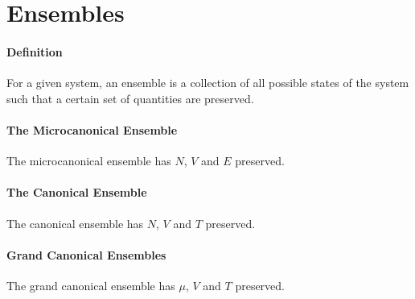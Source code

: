 \section{Ensembles}

\paragraph{Definition}
For a given system, an ensemble is a collection of all possible states of the system such that a certain set of quantities are preserved.

\paragraph{The Microcanonical Ensemble}
The microcanonical ensemble has $N$, $V$ and $E$ preserved.

\paragraph{The Canonical Ensemble}
The canonical ensemble has $N$, $V$ and $T$ preserved.

\paragraph{Grand Canonical Ensembles}
The grand canonical ensemble has $\mu$, $V$ and $T$ preserved.